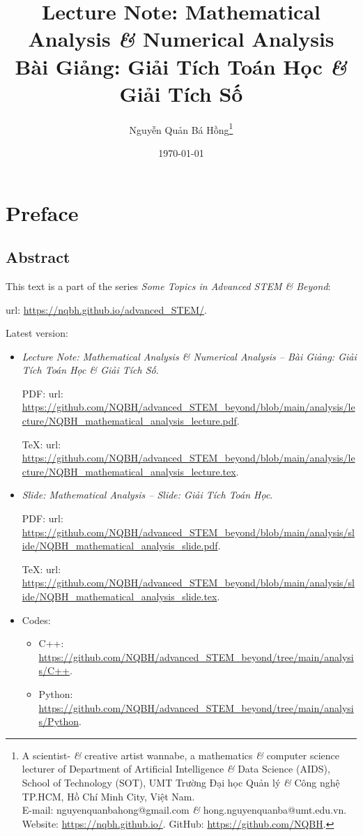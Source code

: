 \documentclass[oneside]{book}
\title{Lecture Note: Mathematical Analysis {\it\&} Numerical Analysis\\Bài Giảng: Giải Tích Toán Học {\it\&} Giải Tích Số}
\author{Nguyễn Quản Bá Hồng\footnote{A scientist- {\it\&} creative artist wannabe, a mathematics {\it\&} computer science lecturer of Department of Artificial Intelligence {\it\&} Data Science (AIDS), School of Technology (SOT), UMT Trường Đại học Quản lý {\it\&} Công nghệ TP.HCM, Hồ Chí Minh City, Việt Nam.\\E-mail: {\sf nguyenquanbahong@gmail.com} {\it\&} {\sf hong.nguyenquanba@umt.edu.vn}. Website: \url{https://nqbh.github.io/}. GitHub: \url{https://github.com/NQBH}.}}
\date{\today}
\begin{document}
\maketitle
\setcounter{secnumdepth}{4}
\setcounter{tocdepth}{4}
\dominitoc %
\tableofcontents


\chapter*{Preface}
\minitoc
\section*{Abstract}
This text is a part of the series {\it Some Topics in Advanced STEM \& Beyond}:

{\sc url}: \url{https://nqbh.github.io/advanced_STEM/}.

Latest version:
\begin{itemize}
	\item {\it Lecture Note: Mathematical Analysis \& Numerical Analysis -- Bài Giảng: Giải Tích Toán Học \& Giải Tích Số}.
	
	PDF: {\sc url}: \url{https://github.com/NQBH/advanced_STEM_beyond/blob/main/analysis/lecture/NQBH_mathematical_analysis_lecture.pdf}.
	
	\TeX: {\sc url}: \url{https://github.com/NQBH/advanced_STEM_beyond/blob/main/analysis/lecture/NQBH_mathematical_analysis_lecture.tex}.
	\item {\it Slide: Mathematical Analysis -- Slide: Giải Tích Toán Học}.
	
	PDF: {\sc url}: \url{https://github.com/NQBH/advanced_STEM_beyond/blob/main/analysis/slide/NQBH_mathematical_analysis_slide.pdf}.
	
	\TeX: {\sc url}: \url{https://github.com/NQBH/advanced_STEM_beyond/blob/main/analysis/slide/NQBH_mathematical_analysis_slide.tex}.
	\item Codes:
	\begin{itemize}
		\item C++: \url{https://github.com/NQBH/advanced_STEM_beyond/tree/main/analysis/C++}.
		\item Python: \url{https://github.com/NQBH/advanced_STEM_beyond/tree/main/analysis/Python}.
	\end{itemize}
\end{itemize}

\end{document}
